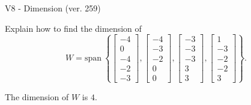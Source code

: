 \begin{exercise}
  \begin{exerciseTitle}V8 - Dimension (ver. 259)\end{exerciseTitle}
  \begin{exerciseStatement}
    Explain how to find the dimension of 
\[W=\mathrm{span}\ \left\{\left[\begin{array}{r}
-4 \\
0 \\
-4 \\
-2 \\
-3
\end{array}\right] , \left[\begin{array}{r}
-4 \\
-3 \\
-2 \\
0 \\
0
\end{array}\right] , \left[\begin{array}{r}
-3 \\
-3 \\
-3 \\
3 \\
3
\end{array}\right] , \left[\begin{array}{r}
1 \\
-3 \\
-2 \\
-2 \\
3
\end{array}\right]\right\}.\]



  \end{exerciseStatement}
  \begin{exerciseAnswer}
   The dimension of \(W\) is  \(4\).
  


  \end{exerciseAnswer}
\end{exercise}